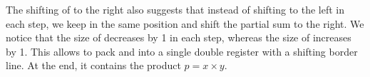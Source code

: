 The shifting of  to the right also suggests that instead of shifting  to the left in each step, we keep  in the same position and shift the partial sum  to the right. We notice that the size of  decreases by 1 in each step, whereas the size of  increases by 1. This allows to pack  and  into a single double register  with a shifting border line. At the end, it contains the product $p = x \times y$.

\medskip
{}\medskip

